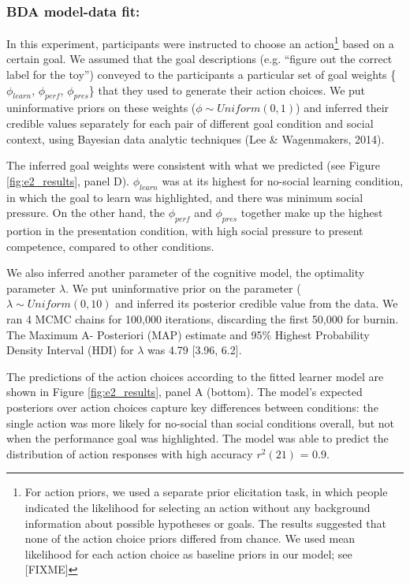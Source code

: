 \documentclass[10pt, letterpaper]{article}
\begin{document}
\subsubsection{BDA model-data fit:}\label{bda-model-data-fit}

In this experiment, participants were instructed to choose an
action\footnote{For action priors, we used a separate prior elicitation task, in which people indicated the likelihood for selecting an action without any background information about possible hypotheses or goals. The results suggested that none of the action choice priors differed from chance. We used mean likelihood for each action choice as baseline priors in our model; see [FIXME]}
based on a certain goal. We assumed that the goal descriptions (e.g.
``figure out the correct label for the toy'') conveyed to the
participants a particular set of goal weights \{\(\phi_{learn}\),
\(\phi_{perf}\), \(\phi_{pres}\)\} that they used to generate their
action choices. We put uninformative priors on these weights
(\(\phi \sim Uniform(0,1)\)) and inferred their credible values
separately for each pair of different goal condition and social context,
using Bayesian data analytic techniques (Lee \& Wagenmakers, 2014).

The inferred goal weights were consistent with what we predicted (see
Figure \ref{fig:e2_results}, panel D). \(\phi_{learn}\) was at its
highest for no-social learning condition, in which the goal to learn was
highlighted, and there was minimum social pressure. On the other hand,
the \(\phi_{perf}\) and \(\phi_{pres}\) together make up the highest
portion in the presentation condition, with high social pressure to
present competence, compared to other conditions.

We also inferred another parameter of the cognitive model, the
optimality parameter \(\lambda\). We put uninformative prior on the
parameter (\(\lambda \sim Uniform(0,10)\) and inferred its posterior
credible value from the data. We ran 4 MCMC chains for 100,000
iterations, discarding the first 50,000 for burnin. The Maximum A-
Posteriori (MAP) estimate and 95\% Highest Probability Density Interval
(HDI) for \(\lambda\) was 4.79 {[}3.96, 6.2{]}.

The predictions of the action choices according to the fitted learner
model are shown in Figure \ref{fig:e2_results}, panel A (bottom). The
model's expected posteriors over action choices capture key differences
between conditions: the single action was more likely for no-social than
social conditions overall, but not when the performance goal was
highlighted. The model was able to predict the distribution of action
responses with high accuracy \(r^2(21)\) = 0.9.
\end{document}
